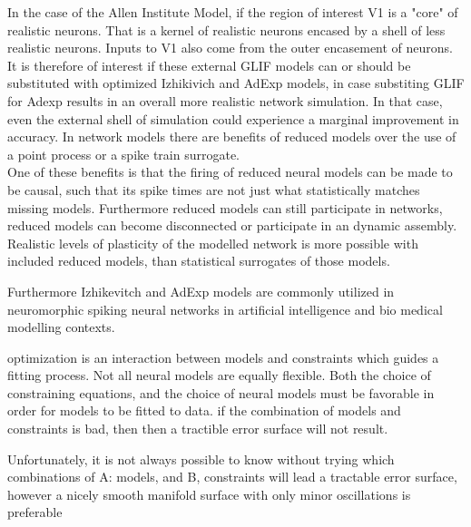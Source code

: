 In the case of the Allen Institute Model, if the region of interest V1 is a "core" of realistic neurons. That is a kernel of realistic neurons encased by a shell of less realistic neurons. Inputs to V1 also come from the outer encasement of neurons. It is therefore of interest if these external GLIF models can or should be substituted with optimized Izhikivich and AdExp models, in case substiting GLIF for Adexp results in an overall more realistic network simulation. In that case, even the external shell of simulation could experience a marginal improvement in accuracy. In network models there are benefits of reduced models over the use of a point process or a spike train surrogate.\\


One of these benefits is that the firing of reduced neural models can be made to be causal, such that its spike times are not just what statistically matches missing models. Furthermore reduced models can still participate in networks, reduced models can become disconnected or participate in an dynamic assembly. Realistic levels of plasticity of the modelled network is more possible with included reduced models, than statistical surrogates of those models.

Furthermore Izhikevitch and AdExp models are commonly utilized in neuromorphic spiking neural networks in artificial intelligence and bio medical modelling contexts.

optimization is an interaction between models and constraints which guides a fitting process. Not all neural models are equally flexible.  
Both the choice of constraining equations, and the choice of neural models must be favorable in order for models to be fitted to data.
if the combination of models and constraints is bad, then then a tractible error surface will not result.  

Unfortunately, it is not always possible to know without trying which combinations of A: models, and B, constraints will lead a tractable error surface, however a nicely smooth manifold surface with only minor oscillations is preferable


